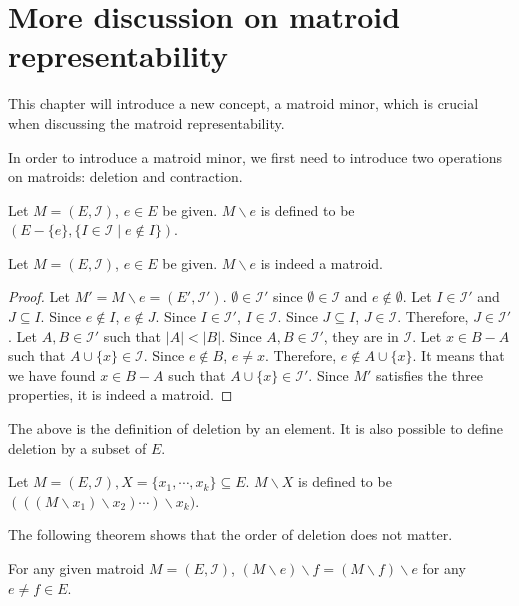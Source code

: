 \section{More discussion on matroid representability}
This chapter will introduce a new concept, a matroid minor, which is crucial when discussing the matroid representability.

In order to introduce a matroid minor, we first need to introduce two operations on matroids: deletion and contraction.

\begin{defn}
Let $M = (E, \mathcal{I})$, $e \in E$ be given.
$M \backslash e$ is defined to be $(E - \{ e \}, \{ I \in \mathcal{I} \mid e \notin I \})$.
\end{defn}

\begin{thm}
Let $M = (E, \mathcal{I})$, $e \in E$ be given.
$M \backslash e$ is indeed a matroid.
\end{thm}

\begin{proof}
Let $M' = M \backslash e = (E', \mathcal{I}')$.
$\emptyset \in \mathcal{I}'$ since $\emptyset \in \mathcal{I}$ and $e \notin \emptyset$.
Let $I \in \mathcal{I}'$ and $J \subseteq I$.
Since $e \notin I$, $e \notin J$.
Since $I \in \mathcal{I}'$, $I \in \mathcal{I}$.
Since $J \subseteq I$, $J \in \mathcal{I}$.
Therefore, $J \in \mathcal{I}'$.
Let $A, B \in \mathcal{I}'$ such that $\lvert A \rvert < \lvert B \rvert$.
Since $A, B \in \mathcal{I}'$, they are in $\mathcal{I}$.
Let $x \in B - A$ such that $A \cup \{ x \} \in \mathcal{I}$.
Since $e \notin B$, $e \neq x$.
Therefore, $e \notin A \cup \{ x \}$.
It means that we have found $x \in B - A$ such that $A \cup \{ x \} \in \mathcal{I}'$.
Since $M'$ satisfies the three properties, it is indeed a matroid.
\end{proof}

The above is the definition of deletion by an element.
It is also possible to define deletion by a subset of $E$.

\begin{defn}
Let $M = (E, \mathcal{I}), X = \{ x_1, \cdots, x_k \} \subseteq E$.
$M \backslash X$ is defined to be $(((M \backslash x_1) \backslash x_2) \cdots) \backslash x_k)$.
\end{defn}

The following theorem shows that the order of deletion does not matter.

\begin{thm}
For any given matroid $M = (E, \mathcal{I})$,
$(M \backslash e) \backslash f = (M \backslash f) \backslash e$ for any $e \neq f \in E$.
\end{thm}

